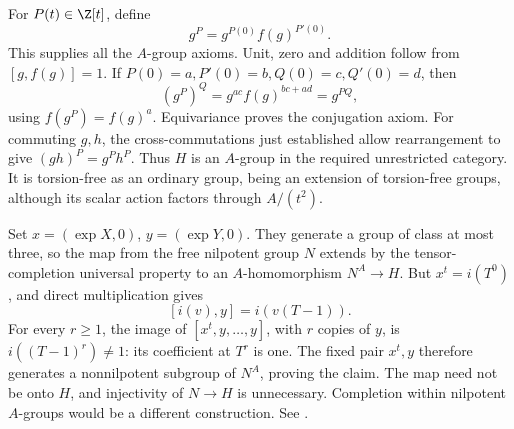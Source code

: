 For \(P(t)\in\Z[t]\), define
\[
 g^P=g^{P(0)}f(g)^{P'(0)}.
\]
This supplies all the \(A\)-group axioms. Unit, zero and addition
follow from \([g,f(g)]=1\).
If \(P(0)=a,P'(0)=b,Q(0)=c,Q'(0)=d\), then
\[
 (g^P)^Q=g^{ac}f(g)^{bc+ad}=g^{PQ},
\]
using \(f(g^P)=f(g)^a\).
Equivariance proves the conjugation axiom. For commuting \(g,h\),
the cross-commutations just established allow rearrangement to give
\((gh)^P=g^Ph^P\).
Thus \(H\) is an \(A\)-group in the required unrestricted category.
It is torsion-free as an ordinary group, being an extension of
torsion-free groups, although its scalar action factors through
\(A/(t^2)\).

Set \(x=(\exp X,0)\), \(y=(\exp Y,0)\).
They generate a group of class at most three, so the map from the
free nilpotent group \(N\) extends by the tensor-completion universal
property to an \(A\)-homomorphism \(N^A\to H\).
But \(x^t=i(T^0)\), and direct multiplication gives
\[
 [i(v),y]=i(v(T-1)).
\]
For every \(r\ge1\), the image of \([x^t,y,\ldots,y]\), with \(r\)
copies of \(y\), is \(i((T-1)^r)\ne1\): its coefficient at \(T^r\)
is one. The fixed pair \(x^t,y\) therefore generates a nonnilpotent
subgroup of \(N^A\), proving the claim.
The map need not be onto \(H\), and injectivity of \(N\to H\) is
unnecessary. Completion within nilpotent \(A\)-groups would be a
different construction. See .
